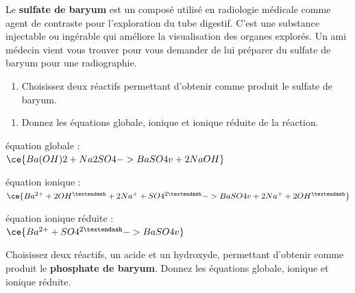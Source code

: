 \documentclass[
  11pt,
  a4paper,
  openany]{book}
\providecommand{\tightlist}{%
  \setlength{\itemsep}{0pt}\setlength{\parskip}{0pt}}
\begin{document}
\begin{Exercise}

Le \textbf{sulfate de baryum} est un composé utilisé en radiologie médicale comme agent de contraste pour l'exploration du tube digestif. C'est une substance injectable ou ingérable qui améliore la visualisation des organes explorés. Un ami médecin vient vous trouver pour vous demander de lui préparer du sulfate de baryum pour une radiographie.

\begin{enumerate}
\def\labelenumi{\arabic{enumi}.}
\tightlist
\item
  Choisissez deux réactifs permettant d'obtenir comme produit le sulfate de baryum.
\end{enumerate}


\begin{enumerate}
\def\labelenumi{\arabic{enumi}.}
\setcounter{enumi}{1}
\tightlist
\item
  Donnez les équations globale, ionique et ionique réduite de la réaction.
\end{enumerate}


\end{Exercise}

\begin{Answer}
équation globale :\\
\(\ce{Ba(OH)2 + Na2SO4 -> BaSO4 v + 2 NaOH}\)

équation ionique :\\
\(\ce{Ba^{2+} + 2 OH^{–} + 2 Na^{+} + SO4^{2–} -> BaSO4 v + 2 Na^{+} + 2 OH^{–}}\)

équation ionique réduite :\\
\(\ce{Ba^{2+} + SO4^{2–} -> BaSO4 v}\)

\end{Answer}

\begin{Exercise}

Choisissez deux réactifs, un acide et un hydroxyde, permettant d'obtenir comme produit le \textbf{phosphate de baryum}. Donnez les équations globale, ionique et ionique réduite.


\end{Exercise}
\end{document}
